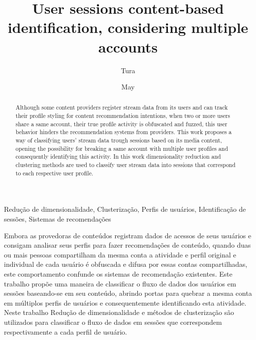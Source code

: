 \documentclass[ecp,tc,english]{iiufrgs}
\title{User sessions content-based identification, considering multiple accounts}
\author{Tura}{Matheus Toazza}
\date{May}{2021}
\begin{document}
\maketitle




\begin{abstract}
  Although some content providers register stream data from its users and can track their profile styling for content recommendation intentions, when two or more users share a same account, their true profile activity is obfuscated and fuzzed, this user behavior hinders the recommendation systems from providers. 
  This work proposes a way of classifying users' stream data trough sessions based on its media content, opening the possibility for breaking a same account with multiple user profiles and consequently identifying this activity. In this work dimensionality reduction and clustering methods are used to classify user stream data into sessions that correspond to each respective user profile.
\end{abstract}

\begin{englishabstract}{}{Redução de dimensionalidade, Clusterização, Perfis de usuários, Identificação de sessões, Sistemas de recomendações}

  Embora as provedoras de conteúdos registram dados de acessos de seus usuários e consigam analisar seus perfis para fazer recomendações de conteúdo, quando duas ou mais pessoas compartilham da mesma conta a atividade e perfil original e individual de cada usuário é obfuscada e difusa por essas contas compartilhadas, este comportamento confunde os sistemas de recomendação existentes. 
  Este trabalho propõe uma maneira de classificar o fluxo de dados dos usuários em sessões baseando-se em seu conteúdo, abrindo portas para quebrar a mesma conta em múltiplos perfis de usuários e consequentemente identificando esta atividade. Neste trabalho Redução de dimensionalidade e métodos de clusterização são utilizados para classificar o fluxo de dados em sessões que correspondem respectivamente a cada perfil de usuário.
\end{englishabstract}
\end{document}
